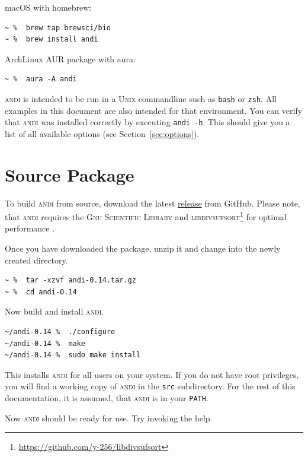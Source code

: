 \documentclass[a4paper,
  10pt,
  english,
  DIV=12,
  BCOR=8mm]{scrbook}
\newcommand{\algo}[1]{\textsc{{#1}}}
\newcommand{\andi}{\algo{andi}\xspace}
\begin{document}
\noindent macOS with homebrew:

\begin{lstlisting}
~ %  brew tap brewsci/bio
~ %  brew install andi
\end{lstlisting}

\noindent ArchLinux AUR package with aura:

\begin{lstlisting}
~ %  aura -A andi
\end{lstlisting}

\andi is intended to be run in a \algo{Unix} commandline such as \lstinline$bash$ or \lstinline$zsh$. All examples in this document are also intended for that environment. You can verify that \andi was installed correctly by executing \lstinline$andi -h$. This should give you a list of all available options (see Section~\ref{sec:options}).

\section{Source Package} \label{sub:regular}

To build \andi from source, download the latest \href{https://github.com/EvolBioInf/andi/releases}{release} from GitHub. Please note, that \andi requires the \algo{Gnu Scientific Library} and \algo{libdivsufsort}\footnote{\url{https://github.com/y-256/libdivsufsort}} for optimal performance \cite{divsufsort}.

Once you have downloaded the package, unzip it and change into the newly created directory. 

\begin{lstlisting}
~ %  tar -xzvf andi-0.14.tar.gz
~ %  cd andi-0.14
\end{lstlisting}

\noindent Now build and install \andi.

\begin{lstlisting}
~/andi-0.14 %  ./configure
~/andi-0.14 %  make
~/andi-0.14 %  sudo make install
\end{lstlisting}

\noindent This installs \andi for all users on your system. If you do not have root privileges, you will find a working copy of \andi in the \lstinline$src$ subdirectory. For the rest of this documentation, it is assumed, that \andi is in your \textdollar\lstinline!PATH!.

Now \andi should be ready for use. Try invoking the help.
\end{document}
